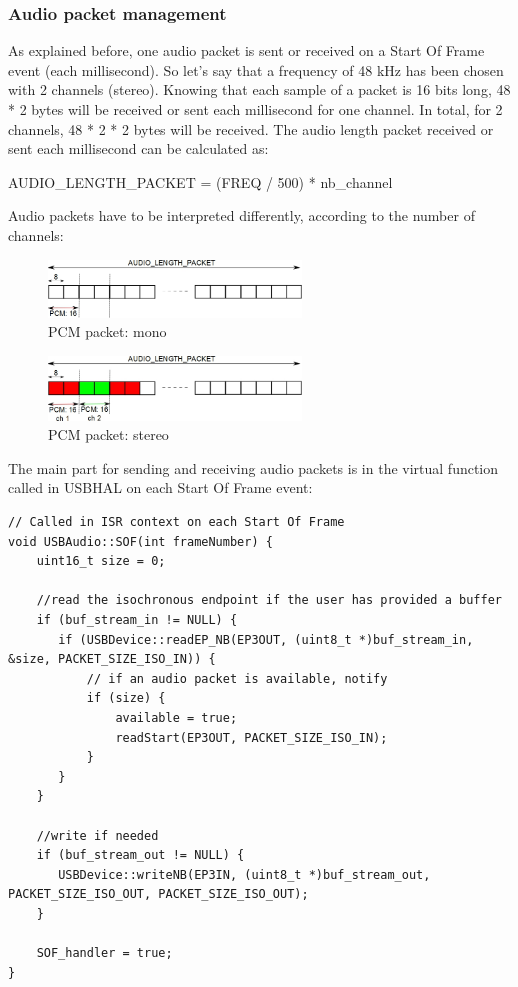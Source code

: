 \documentclass[pdftex,10pt,a4paper]{report}
\begin{document}
\subsubsection{Audio packet management}
As explained before, one audio packet is sent or received on a Start Of Frame event (each millisecond). So let's say that a frequency of 48 kHz has been chosen with 2 channels (stereo). Knowing that each sample of a packet is 16 bits long, 48 * 2 bytes will be received or sent each millisecond for one channel. In total, for 2 channels, 48 * 2 * 2 bytes will be received. The audio length packet received or sent each millisecond can be calculated as:
\begin{center}
	AUDIO\_LENGTH\_PACKET = (FREQ / 500) * nb\_channel
\end{center}

Audio packets have to be interpreted differently, according to the number of channels:

\begin{figure}[h!]
		\centering
		\includegraphics[width=0.6\textwidth]{./pcm.jpg}
		\caption{PCM packet: mono}
		\label{PCM packet: mono}
\end{figure}

\begin{figure}[h!]
		\centering
		\includegraphics[width=0.6\textwidth]{./pcm_stereo.jpg}
		\caption{PCM packet: stereo}
		\label{PCM packet: stereo}
\end{figure}


The main part for sending and receiving audio packets is in the virtual function called in USBHAL on each Start Of Frame event:
\begin{lstlisting}[label=Audio packets management in SOF events,caption=Audio packets management in SOF events]
// Called in ISR context on each Start Of Frame
void USBAudio::SOF(int frameNumber) {
    uint16_t size = 0;
    
    //read the isochronous endpoint if the user has provided a buffer
    if (buf_stream_in != NULL) {
       if (USBDevice::readEP_NB(EP3OUT, (uint8_t *)buf_stream_in, &size, PACKET_SIZE_ISO_IN)) {
           // if an audio packet is available, notify
           if (size) {
               available = true;
               readStart(EP3OUT, PACKET_SIZE_ISO_IN);
           }
       }
    }
    
    //write if needed
    if (buf_stream_out != NULL) {
       USBDevice::writeNB(EP3IN, (uint8_t *)buf_stream_out, PACKET_SIZE_ISO_OUT, PACKET_SIZE_ISO_OUT);
    }

    SOF_handler = true;
}
\end{lstlisting}
\end{document}
